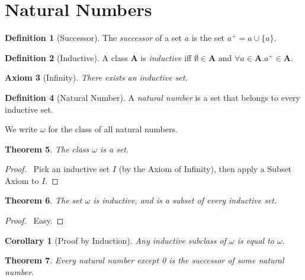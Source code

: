 \documentclass{article}
\let\qed\relax
\newtheorem{axiom}{Axiom}
\newtheorem{theorem}[axiom]{Theorem}
\newtheorem{corollary}{Corollary}[axiom]
\theoremstyle{definition}
\newtheorem{definition}[axiom]{Definition}
\begin{document}
    \section{Natural Numbers}

    \begin{definition}[Successor]
        The \emph{successor} of a set $a$ is the set $a^+ = a \cup \{ a \}$.
    \end{definition}

    \begin{definition}[Inductive]
        A class $\mathbf{A}$ is \emph{inductive} iff $\emptyset \in \mathbf{A}$ and
        $\forall a \in \mathbf{A}. a^+ \in \mathbf{A}$.
    \end{definition}

    \begin{axiom}[Infinity]
        There exists an inductive set.
    \end{axiom}

    \begin{definition}[Natural Number]
        A \emph{natural number} is a set that belongs to every inductive set.

        We write $\omega$ for the class of all natural numbers.
    \end{definition}

    \begin{theorem}
        The class $\omega$ is a set.
    \end{theorem}

    \begin{proof}
        \pf\ Pick an inductive set $I$ (by the Axiom of Infinity), then apply a Subset Axiom to $I$. \qed
    \end{proof}

    \begin{theorem}
        The set $\omega$ is inductive, and is a subset of every inductive set.
    \end{theorem}

    \begin{proof}
        \pf\ Easy. \qed
    \end{proof}

    \begin{corollary}[Proof by Induction]
        Any inductive subclass of $\omega$ is equal to $\omega$.
    \end{corollary}

    \begin{theorem}
        Every natural number except 0 is the successor of some natural number.
    \end{theorem}
\end{document}
